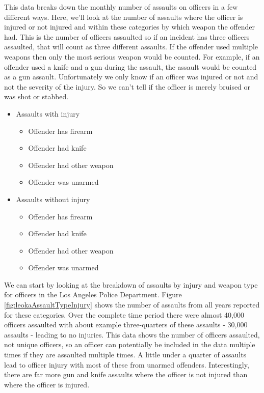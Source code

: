 \documentclass[
  12pt,
  openany]{book}
\providecommand{\tightlist}{%
  \setlength{\itemsep}{0pt}\setlength{\parskip}{0pt}}
\begin{document}
This data breaks down the monthly number of assaults on officers in a few different ways. Here, we'll look at the number of assaults where the officer is injured or not injured and within these categories by which weapon the offender had. This is the number of officers assaulted so if an incident has three officers assaulted, that will count as three different assaults. If the offender used multiple weapons then only the most serious weapon would be counted. For example, if an offender used a knife and a gun during the assault, the assault would be counted as a gun assault. Unfortunately we only know if an officer was injured or not and not the severity of the injury. So we can't tell if the officer is merely bruised or was shot or stabbed.

\begin{itemize}
\tightlist
\item
  Assaults with injury

  \begin{itemize}
  \tightlist
  \item
    Offender has firearm
  \item
    Offender had knife
  \item
    Offender had other weapon
  \item
    Offender was unarmed
  \end{itemize}
\item
  Assaults without injury

  \begin{itemize}
  \tightlist
  \item
    Offender has firearm
  \item
    Offender had knife
  \item
    Offender had other weapon
  \item
    Offender was unarmed
  \end{itemize}
\end{itemize}

We can start by looking at the breakdown of assaults by injury and weapon type for officers in the Los Angeles Police Department. Figure \ref{fig:leokaAssaultTypeInjury} shows the number of assaults from all years reported for these categories. Over the complete time period there were almost 40,000 officers assaulted with about example three-quarters of these assaults - 30,000 assaults - leading to no injuries. This data shows the number of officers assaulted, not unique officers, so an officer can potentially be included in the data multiple times if they are assaulted multiple times. A little under a quarter of assaults lead to officer injury with most of these from unarmed offenders. Interestingly, there are far more gun and knife assaults where the officer is not injured than where the officer is injured.
\end{document}
